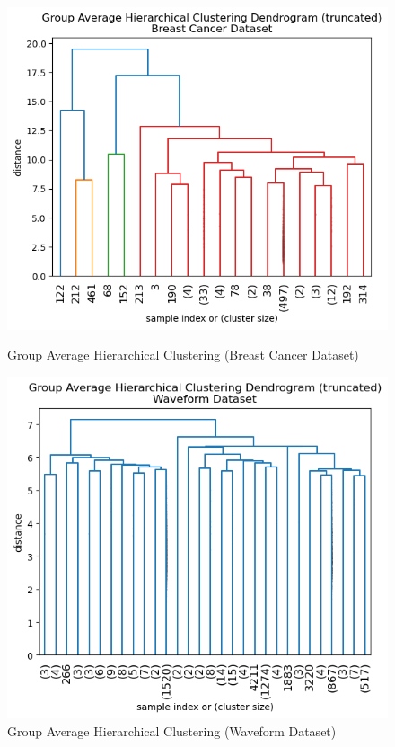 \documentclass{article}
\begin{document}
\begin{figure}[H]
    \centering
    \begin{minipage}[b]{0.49\textwidth}
        \centering
        \includegraphics[width=\textwidth, height=0.3\textheight]{average_cancer_dend.png}
        \caption{Group Average Hierarchical Clustering (Breast Cancer Dataset)}
    \end{minipage}
    \hfill
    \begin{minipage}[b]{0.49\textwidth}
        \centering
        \includegraphics[width=\textwidth, height=0.3\textheight]{average_waveform_dend.png}
        \caption{Group Average Hierarchical Clustering (Waveform Dataset)}
    \end{minipage}
\end{figure}
\end{document}
